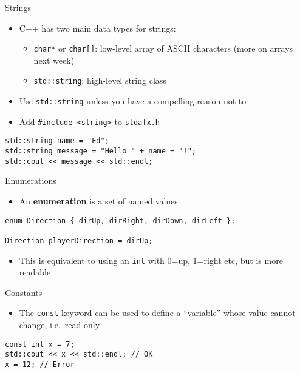 \begin{frame}[fragile]{Strings}
	\begin{itemize}
		\item C++ has two main data types for strings:
		\begin{itemize}
			\item \lstinline{char*} or \lstinline{char[]}: low-level array of ASCII characters (more on arrays next week)
			\item \lstinline{std::string}: high-level string class
		\end{itemize}
		\pause
		\item Use \lstinline{std::string} unless you have a compelling reason not to
		\pause
		\item Add \lstinline{#include <string>} to \texttt{stdafx.h}
	\end{itemize}
	\pause
	\begin{lstlisting}
std::string name = "Ed";
std::string message = "Hello " + name + "!";
std::cout << message << std::endl;
	\end{lstlisting}
\end{frame}

\begin{frame}[fragile]{Enumerations}
	\begin{itemize}
		\item An \textbf{enumeration} is a set of named values
	\end{itemize}
	\pause
	\begin{lstlisting}
enum Direction { dirUp, dirRight, dirDown, dirLeft };

Direction playerDirection = dirUp;
	\end{lstlisting}
	\pause
	\begin{itemize}
		\item This is equivalent to using an \lstinline{int} with 0=up, 1=right etc, but is more readable
	\end{itemize}
\end{frame}

\begin{frame}[fragile]{Constants}
	\begin{itemize}
		\item The \lstinline{const} keyword can be used to define a ``variable'' whose value cannot change, i.e.\ read only
	\end{itemize}
	\pause
	\begin{lstlisting}
const int x = 7;
std::cout << x << std::endl; // OK
x = 12; // Error
	\end{lstlisting}
\end{frame}

